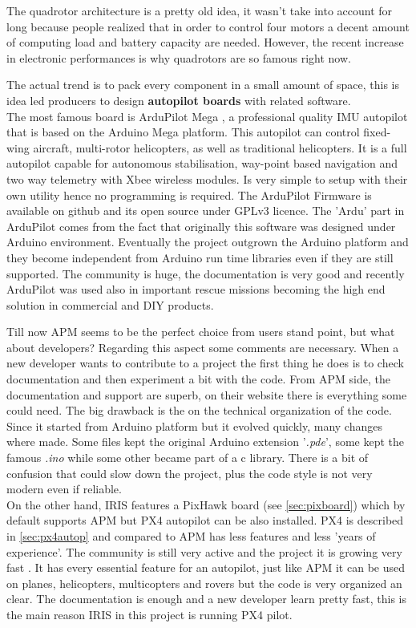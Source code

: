 The quadrotor architecture is a pretty old idea, it wasn't take into account for long because people realized that in order to control four motors a decent amount of computing load and battery capacity are needed. However, the recent increase in electronic performances is why quadrotors are so famous right now.\par The actual trend is to pack every component in a small amount of space, this is idea led producers to design \textbf{autopilot boards} with related software.\\ 
The most famous board is ArduPilot Mega \cite{ArduP}, a professional quality IMU autopilot that is based on the Arduino Mega platform.  This autopilot can control fixed-wing aircraft, multi-rotor helicopters, as well as traditional helicopters.  It is a full autopilot capable for autonomous stabilisation, way-point based navigation and two way telemetry with Xbee wireless modules. Is very simple to setup with their own utility hence no programming is required. The ArduPilot Firmware \cite{APM} is available on github and its open source under GPLv3 licence. The 'Ardu' part in ArduPilot comes from the fact that originally this software was designed under Arduino environment. Eventually the project outgrown the Arduino platform and they become independent from Arduino run time libraries even if they are still supported. The community is huge, the documentation is very good and recently ArduPilot was used also in important rescue missions becoming the high end solution in commercial and DIY products.\par Till now APM seems to be the perfect choice from users stand point, but what about developers? Regarding this aspect some comments are necessary. When a new developer wants to contribute to a project the first thing he does is to check documentation and then experiment a bit with the code. From APM side, the documentation and support are superb, on their website \cite{APM} there is everything some could need. The big drawback is the on the technical organization of the code. Since it started from Arduino platform but it evolved quickly, many changes where made. Some files kept the original Arduino extension '\textit{.pde}', some kept the famous \textit{.ino} while some other became part of a c library. There is a bit of confusion that could slow down the project, plus the code style is not very modern even if reliable. \\

On the other hand, IRIS features a PixHawk board (see \ref{sec:pixboard}) which by default supports APM but PX4 autopilot can be also installed. PX4\cite{PX4} is  described in \ref{sec:px4autop} and compared to APM has less features and less 'years of experience'. The community is still very active and the project it is growing very fast \cite{PX4Git}. It has every essential feature for an autopilot, just like APM it can be used on planes, helicopters, multicopters and rovers but the code is very organized an clear. The documentation is enough and a new developer learn pretty fast, this is the main reason IRIS in this project is running PX4 pilot.

